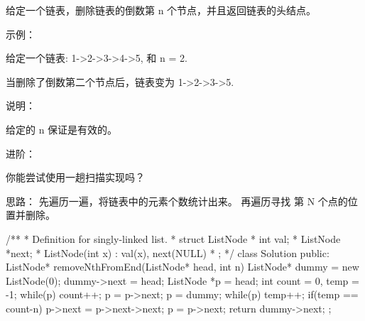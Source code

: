 给定一个链表，删除链表的倒数第 n 个节点，并且返回链表的头结点。

示例：

给定一个链表: 1->2->3->4->5, 和 n = 2.

当删除了倒数第二个节点后，链表变为 1->2->3->5.

说明：

给定的 n 保证是有效的。

进阶：

你能尝试使用一趟扫描实现吗？


































思路：
先遍历一遍，将链表中的元素个数统计出来。
再遍历寻找 第 N 个点的位置并删除。





















/**
 * Definition for singly-linked list.
 * struct ListNode {
 *     int val;
 *     ListNode *next;
 *     ListNode(int x) : val(x), next(NULL) {}
 * };
 */
class Solution {
public:
    ListNode* removeNthFromEnd(ListNode* head, int n) {
        ListNode* dummy = new ListNode(0);
        dummy->next = head;
        ListNode *p = head;
        int count = 0, temp = -1;
        while(p)
        {
            count++; p = p->next;
        }
        p = dummy;
        while(p)
        {
            temp++;
            if(temp == count-n)
            {
                p->next = p->next->next;
            }
            p = p->next;
        }
        return dummy->next;
    }
};